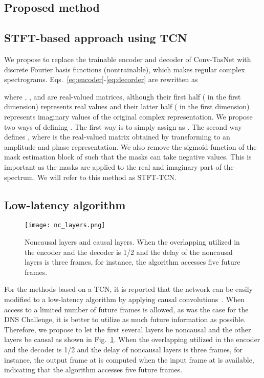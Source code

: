 \documentclass[a4paper]{article}
\begin{document}
\begin{spacing}{0.92}
\vspace{-1mm}
\section{Proposed method}

\subsection{STFT-based approach using TCN}
We propose to replace the trainable encoder and decoder  of Conv-TasNet with discrete Fourier basis functions (nontrainable), which makes  regular complex spectrograms.
Eqs.~\eqref{eq:encoder}-\eqref{eq:decorder} are rewritten as

where , , and  are real-valued matrices, although their first half ( in the first dimension) represents real values and their latter half ( in the first dimension) represents imaginary values of the original complex representation.
We propose two ways of defining .
The first way is to simply assign  as .
The second way defines , where  is the real-valued matrix obtained by transforming  to an amplitude and phase representation.
We also remove the sigmoid function of the mask estimation block of  such that the masks can take negative values. 
This is important as the masks are applied to the real and imaginary part of the spectrum.
We will refer to this method as STFT-TCN.

\subsection{Low-latency algorithm}
\begin{figure}
  \centering
  \texttt{[image: nc\_layers.png]}
  \caption{Noncausal layers and causal layers. When the overlapping utilized in the encoder and the decoder is 1/2 and the delay of the noncausal layers is three frames, for instance, the algorithm accesses five future frames.}
\label{fig:nc_layers}
\end{figure}

For the methods based on a TCN, it is reported that 
the network can be easily modified to a low-latency algorithm by 
applying causal convolutions~\cite{bai2018empirical, luo2019conv}.
When access to a limited number of future frames is allowed, as was the case for the DNS Challenge,
it is better to utilize as much future information as possible.
Therefore, we propose to let the first several layers be noncausal and the other layers be causal as shown in Fig.~\ref{fig:nc_layers}.
When the overlapping utilized in the encoder and the decoder is 1/2 and the delay of noncausal layers is three frames, for instance, the output frame at  is computed when the input frame at  is available, indicating that the algorithm accesses five future frames.


\end{spacing}
\end{document}
